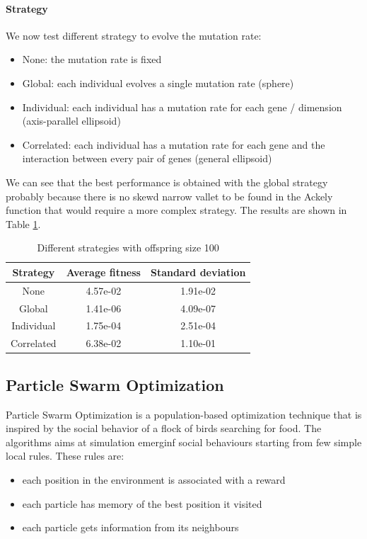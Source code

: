 \paragraph*{Strategy}
We now test different strategy to evolve the mutation rate:
\begin{itemize}
    \item None: the mutation rate is fixed
    \item Global: each individual evolves a single mutation rate (sphere)
    \item Individual: each individual has a mutation rate for each gene / dimension (axis-parallel ellipsoid)
    \item Correlated: each individual has a mutation rate for each gene and the interaction between every pair of genes (general ellipsoid)
\end{itemize}
We can see that the best performance is obtained with the global strategy probably because there is no skewd narrow vallet to be found in the Ackely function that would require a more complex strategy. The results are shown in Table \ref{tab:es-strategy}.
\begin{table}
    \centering
    \begin{tabular}{|c|c|c|}
        Strategy   & Average fitness & Standard deviation \\ \hline
        None       & 4.57e-02        & 1.91e-02           \\
        Global     & 1.41e-06        & 4.09e-07           \\
        Individual & 1.75e-04        & 2.51e-04           \\
        Correlated & 6.38e-02        & 1.10e-01           \\
    \end{tabular}
    \caption{Different strategies with offspring size 100}
    \label{tab:es-strategy}
\end{table}

\subsection{Particle Swarm Optimization}
Particle Swarm Optimization is a population-based optimization technique that is inspired by the social behavior of a flock of birds searching for food. The algorithms aims at simulation emerginf social behaviours starting from few simple local rules. These rules are:
\begin{itemize}
    \item each position in the environment is associated with a reward
    \item each particle has memory of the best position it visited
    \item each particle gets information from its neighbours
\end{itemize}

